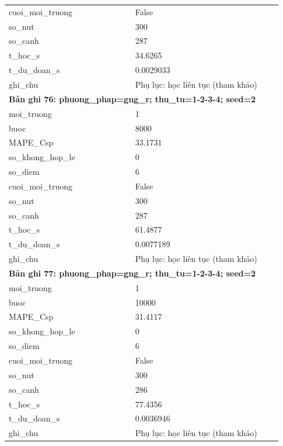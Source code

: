 \begin{longtable}{p{0.43\linewidth}p{0.50\linewidth}}
cuoi\_\allowbreak moi\_\allowbreak truong & False \\
so\_\allowbreak nut & 300 \\
so\_\allowbreak canh & 287 \\
t\_\allowbreak hoc\_\allowbreak s & 34.6265 \\
t\_\allowbreak du\_\allowbreak doan\_\allowbreak s & 0.0029033 \\
ghi\_\allowbreak chu & Phụ lục: học liên tục (tham khảo) \\
\midrule
\multicolumn{2}{p{0.95\linewidth}}{\textbf{Bản ghi 76: phuong\_phap=gng\_r; thu\_tu=1-2-3-4; seed=2}} \\
moi\_\allowbreak truong & 1 \\
buoc & 8000 \\
MAPE\_\allowbreak Csp & 33.1731 \\
so\_\allowbreak khong\_\allowbreak hop\_\allowbreak le & 0 \\
so\_\allowbreak diem & 6 \\
cuoi\_\allowbreak moi\_\allowbreak truong & False \\
so\_\allowbreak nut & 300 \\
so\_\allowbreak canh & 287 \\
t\_\allowbreak hoc\_\allowbreak s & 61.4877 \\
t\_\allowbreak du\_\allowbreak doan\_\allowbreak s & 0.0077189 \\
ghi\_\allowbreak chu & Phụ lục: học liên tục (tham khảo) \\
\midrule
\multicolumn{2}{p{0.95\linewidth}}{\textbf{Bản ghi 77: phuong\_phap=gng\_r; thu\_tu=1-2-3-4; seed=2}} \\
moi\_\allowbreak truong & 1 \\
buoc & 10000 \\
MAPE\_\allowbreak Csp & 31.4117 \\
so\_\allowbreak khong\_\allowbreak hop\_\allowbreak le & 0 \\
so\_\allowbreak diem & 6 \\
cuoi\_\allowbreak moi\_\allowbreak truong & False \\
so\_\allowbreak nut & 300 \\
so\_\allowbreak canh & 286 \\
t\_\allowbreak hoc\_\allowbreak s & 77.4356 \\
t\_\allowbreak du\_\allowbreak doan\_\allowbreak s & 0.0036946 \\
ghi\_\allowbreak chu & Phụ lục: học liên tục (tham khảo) \\

\end{longtable}

